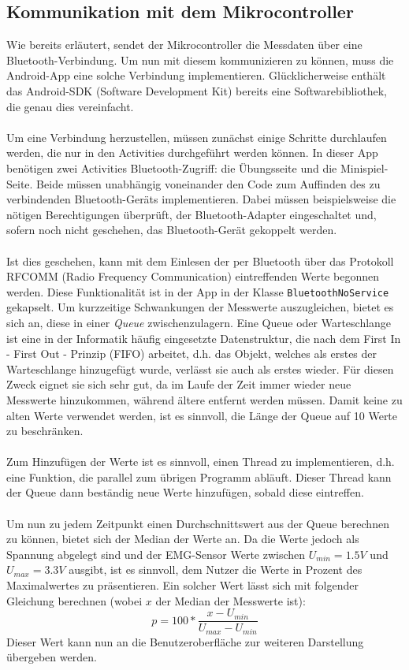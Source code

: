 \subsection{Kommunikation mit dem Mikrocontroller}
Wie bereits erläutert, sendet der Mikrocontroller die Messdaten über eine Bluetooth-Verbindung. Um nun mit  diesem kommunizieren zu können, muss die Android-App eine solche Verbindung implementieren. Glücklicherweise enthält das Android-SDK (Software Development Kit) bereits eine Softwarebibliothek, die genau dies vereinfacht.\cite{Src:AndroidBT} \cite{Src:AndroidKuenneth} \\ \\
Um eine Verbindung herzustellen, müssen zunächst einige Schritte durchlaufen werden, die nur in den Activities durchgeführt werden können. In dieser App benötigen zwei Activities Bluetooth-Zugriff: die Übungsseite und die Minispiel-Seite. Beide müssen unabhängig voneinander den Code zum Auffinden des zu verbindenden Bluetooth-Geräts implementieren. Dabei müssen beispielsweise die nötigen Berechtigungen überprüft, der Bluetooth-Adapter eingeschaltet und, sofern noch nicht geschehen, das Bluetooth-Gerät gekoppelt werden.\cite{Src:AndroidBT} \cite{Src:AndroidKuenneth} \\ \\
Ist dies geschehen, kann mit dem Einlesen der per Bluetooth über das Protokoll RFCOMM (Radio Frequency Communication)\cite{Src:AndroidKuenneth} eintreffenden Werte begonnen werden. Diese Funktionalität ist in der App in der Klasse \texttt{BluetoothNoService} gekapselt. Um kurzzeitige Schwankungen der Messwerte auszugleichen, bietet es sich an, diese in einer \textit{Queue} zwischenzulagern. Eine Queue oder Warteschlange ist eine in der Informatik häufig eingesetzte Datenstruktur, die nach dem First In - First Out - Prinzip (FIFO) arbeitet, d.h. das Objekt, welches als erstes der Warteschlange hinzugefügt wurde, verlässt sie auch als erstes wieder. Für diesen Zweck eignet sie sich sehr gut, da im Laufe der Zeit immer wieder neue Messwerte hinzukommen, während ältere entfernt werden müssen. Damit keine zu alten Werte verwendet werden, ist es sinnvoll, die Länge der Queue auf 10 Werte zu beschränken. \\ \\
Zum Hinzufügen der Werte ist es sinnvoll, einen Thread zu implementieren, d.h. eine Funktion, die parallel zum übrigen Programm abläuft. Dieser Thread kann der Queue dann beständig neue Werte hinzufügen, sobald diese eintreffen. \\ \\
Um nun zu jedem Zeitpunkt einen Durchschnittswert aus der Queue berechnen zu können, bietet sich der Median der Werte an. Da die Werte jedoch als Spannung abgelegt sind und der EMG-Sensor Werte zwischen $U_{min} = 1.5 V$ und $U_{max} = 3.3 V$ ausgibt, ist es sinnvoll, dem Nutzer die Werte in Prozent des Maximalwertes zu präsentieren. Ein solcher Wert lässt sich mit folgender Gleichung berechnen (wobei $x$ der Median der Messwerte ist):
\begin{equation*}
p = 100 * \frac{x - U_{min}}{U_{max} - U_{min}}
\end{equation*}
Dieser Wert kann nun an die Benutzeroberfläche zur weiteren Darstellung übergeben werden.
